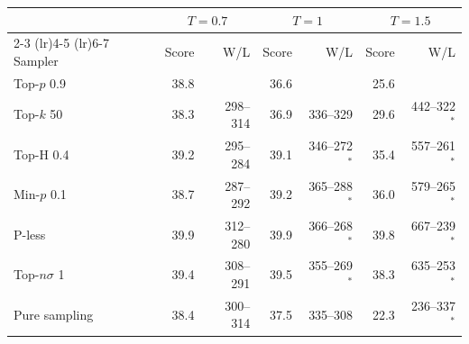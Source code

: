 \begin{tabular}{lrrrrrr}
\toprule
& \multicolumn{2}{c}{$T{=}0.7$} & \multicolumn{2}{c}{$T{=}1$} & \multicolumn{2}{c}{$T{=}1.5$} \\
\cmidrule(lr){2-3} \cmidrule(lr){4-5} \cmidrule(lr){6-7}
Sampler & Score & W/L & Score & W/L & Score & W/L \\
\midrule
Top-$p$ 0.9 & 38.8 &  & 36.6 &  & 25.6 &  \\
Top-$k$ 50 & 38.3 & 298--314 & 36.9 & 336--329 & 29.6 & 442--322$^{*}$ \\
Top-H 0.4 & 39.2 & 295--284 & 39.1 & 346--272$^{*}$ & 35.4 & 557--261$^{*}$ \\
Min-$p$ 0.1 & 38.7 & 287--292 & 39.2 & 365--288$^{*}$ & 36.0 & 579--265$^{*}$ \\
P-less & 39.9 & 312--280 & 39.9 & 366--268$^{*}$ & 39.8 & 667--239$^{*}$ \\
Top-$n\sigma$ 1 & 39.4 & 308--291 & 39.5 & 355--269$^{*}$ & 38.3 & 635--253$^{*}$ \\
Pure sampling & 38.4 & 300--314 & 37.5 & 335--308 & 22.3 & 236--337$^{*}$ \\
\bottomrule
\end{tabular}